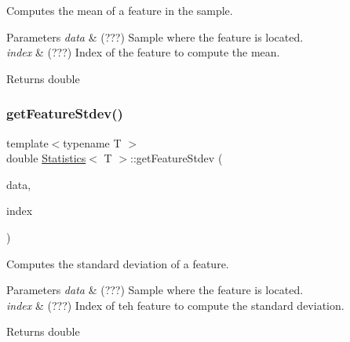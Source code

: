 Computes the mean of a feature in the sample. 


\begin{DoxyParams}{Parameters}
{\em data} & (???) Sample where the feature is located. \\
\hline
{\em index} & (???) Index of the feature to compute the mean. \\
\hline
\end{DoxyParams}
\begin{DoxyReturn}{Returns}
double 
\end{DoxyReturn}
\mbox{\label{class_statistics_abc9b84947508360382100784f43d2b25}} 
\subsubsection{\texorpdfstring{get\+Feature\+Stdev()}{getFeatureStdev()}}
{\footnotesize\ttfamily template$<$typename T $>$ \\
double \mbox{\hyperlink{class_statistics}{Statistics}}$<$ T $>$\+::get\+Feature\+Stdev (\begin{DoxyParamCaption}\item[{\mbox{\hyperlink{class_data}{Data}}$<$ T $>$}]{data,  }\item[{int}]{index }\end{DoxyParamCaption})\hspace{0.3cm}{\ttfamily [static]}}



Computes the standard deviation of a feature. 


\begin{DoxyParams}{Parameters}
{\em data} & (???) Sample where the feature is located. \\
\hline
{\em index} & (???) Index of teh feature to compute the standard deviation. \\
\hline
\end{DoxyParams}
\begin{DoxyReturn}{Returns}
double 
\end{DoxyReturn}
\mbox{\label{class_statistics_a157fcc6f57bed7b0b353bff8145c5964}} 

